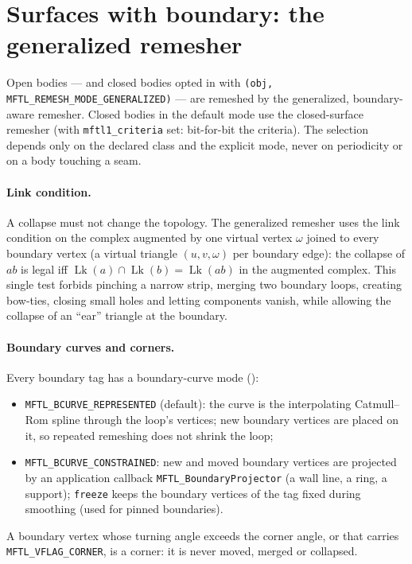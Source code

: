 \section{Surfaces with boundary: the generalized remesher}

Open bodies --- and closed bodies opted in with
\texttt{(obj, MFTL\_REMESH\_MODE\_GENERALIZED)} --- are remeshed by the
generalized, boundary-aware remesher. Closed bodies in the default mode use the closed-surface
remesher (with \texttt{mftl1\_criteria} set: bit-for-bit the \mftlone{} criteria). The selection
depends only on the declared class and the explicit mode, never on periodicity or on a body
touching a seam.

\paragraph{Link condition.} A collapse must not change the topology. The generalized remesher
uses the link condition on the complex augmented by one virtual vertex $\omega$ joined to every
boundary vertex (a virtual triangle $(u,v,\omega)$ per boundary edge): the collapse of $ab$ is
legal iff $\operatorname{Lk}(a)\cap\operatorname{Lk}(b)=\operatorname{Lk}(ab)$ in the augmented
complex. This single test forbids pinching a narrow strip, merging two boundary loops, creating
bow-ties, closing small holes and letting components vanish, while allowing the collapse of an
``ear'' triangle at the boundary.

\paragraph{Boundary curves and corners.} Every boundary tag has a boundary-curve mode
():
\begin{itemize}
  \item \texttt{MFTL\_BCURVE\_REPRESENTED} (default): the curve is the interpolating Catmull--Rom
    spline through the loop's vertices; new boundary vertices are placed on it, so repeated
    remeshing does not shrink the loop;
  \item \texttt{MFTL\_BCURVE\_CONSTRAINED}: new and moved boundary vertices are projected by an
    application callback \texttt{MFTL\_BoundaryProjector} (a wall line, a ring, a support);
    \texttt{freeze} keeps the boundary vertices of the tag fixed during smoothing (used for
    pinned boundaries).
\end{itemize}
A boundary vertex whose turning angle exceeds the corner angle, or that carries
\texttt{MFTL\_VFLAG\_CORNER}, is a corner: it is never moved, merged or collapsed.

